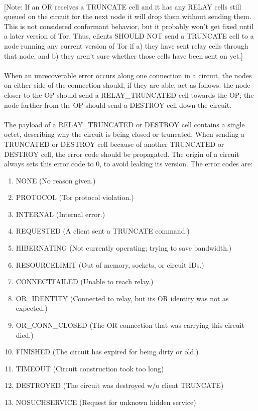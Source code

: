 \paragraph{}
[Note: If an OR receives a TRUNCATE cell and it has any RELAY cells
still queued on the circuit for the next node it will drop them
without sending them. This is not considered conformant behavior,
but it probably won't get fixed until a later version of Tor. Thus,
clients SHOULD NOT send a TRUNCATE cell to a node running any current
version of Tor if a) they have sent relay cells through that node,
and b) they aren't sure whether those cells have been sent on yet.]

\paragraph{}
When an unrecoverable error occurs along one connection in a
circuit, the nodes on either side of the connection should, if they
are able, act as follows: the node closer to the OP should send a
RELAY\_TRUNCATED cell towards the OP; the node farther from the OP
should send a DESTROY cell down the circuit.

\paragraph{}
The payload of a RELAY\_TRUNCATED or DESTROY cell contains a single octet,
describing why the circuit is being closed or truncated. When sending a
TRUNCATED or DESTROY cell because of another TRUNCATED or DESTROY cell,
the error code should be propagated. The origin of a circuit always sets
this error code to 0, to avoid leaking its version. The error codes are:

\begin{enumerate}
    \item NONE (No reason given.)
    \item PROTOCOL (Tor protocol violation.)
    \item INTERNAL (Internal error.)
    \item REQUESTED (A client sent a TRUNCATE command.)
    \item HIBERNATING (Not currently operating; trying to save bandwidth.)
    \item RESOURCELIMIT (Out of memory, sockets, or circuit IDs.)
    \item CONNECTFAILED (Unable to reach relay.)
    \item OR\_IDENTITY (Connected to relay, but its OR identity was not
    as expected.)
    \item OR\_CONN\_CLOSED (The OR connection that was carrying this circuit
    died.)
    \item FINISHED (The circuit has expired for being dirty or old.)
    \item TIMEOUT (Circuit construction took too long)
    \item DESTROYED (The circuit was destroyed w/o client TRUNCATE)
    \item NOSUCHSERVICE (Request for unknown hidden service)
\end{enumerate}


